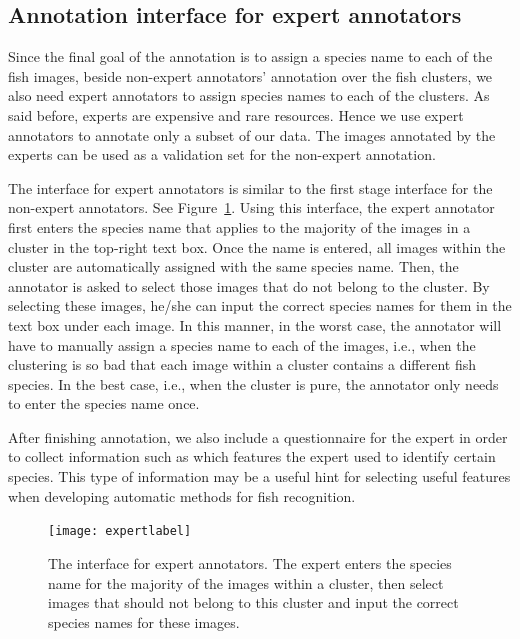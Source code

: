\subsection{Annotation interface for expert annotators}
Since the final goal of the annotation is to assign a species name to each of the fish images, 
beside non-expert annotators' annotation over the fish clusters, we also need expert annotators
to assign species names to each of the clusters. 
%
As said before, experts are expensive and rare resources. Hence we use expert annotators to annotate
only a subset of our data.
The images annotated by the experts can be used as a validation set for the non-expert annotation.

The interface for expert annotators is similar to the first stage interface for the non-expert
annotators. See Figure~\ref{fig:expert}. Using this interface, the expert annotator first enters the species
name that applies to the majority of the images in a cluster in the top-right text box.
Once the name is entered, all images within the cluster are automatically assigned with the same species name. 
Then, the annotator is asked to select those images that do not belong to the cluster. 
By selecting these images, he/she can input the correct species names for them in the text box
under each image. In this manner, in the worst case, the annotator will have to manually assign a species
name to each of the images, i.e., when the clustering is so bad that each image within a cluster
contains a different fish species. In the best case, i.e., when the cluster is pure, 
the annotator only needs to enter the species name once.

After finishing annotation, we also include a questionnaire for the expert in order to collect
information such as which features the expert used to identify certain species. This type of information
may be a useful hint for selecting useful features when developing automatic methods for fish recognition.    

\begin{figure}
\begin{center}
\texttt{[image: expertlabel]}
\caption{The interface for expert annotators. The expert enters the species name for the majority
of the images within a cluster, then select images that should not belong to this cluster and
input the correct species names for these images.}
\label{fig:expert}
\end{center}
\end{figure}


